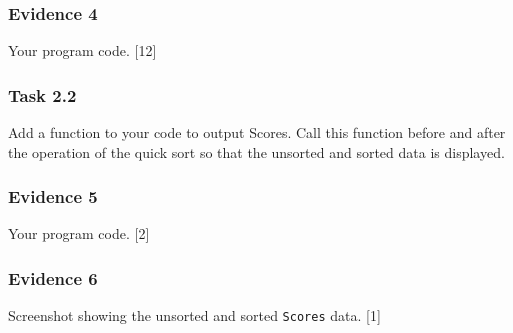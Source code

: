 \subsubsection*{Evidence 4}

Your program code. \hfill{}{[}12{]}

\subsubsection*{Task 2.2}

Add a function to your code to output Scores. Call this function before
and after the operation of the quick sort so that the unsorted and
sorted data is displayed.

\subsubsection*{Evidence 5}

Your program code. \hfill{}{[}2{]}

\subsubsection*{Evidence 6}

Screenshot showing the unsorted and sorted \texttt{Scores} data.\hfill{}
{[}1{]}
